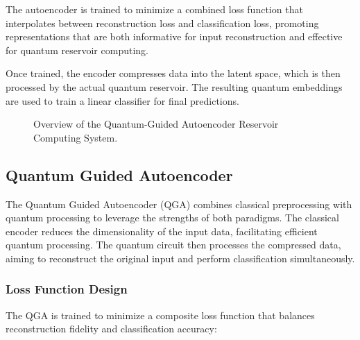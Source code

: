 \documentclass[conference]{IEEEtran}
\begin{document}
The autoencoder is trained to minimize a combined loss 
function that interpolates between reconstruction loss and 
classification loss, promoting representations that are both 
informative for input reconstruction and effective for quantum 
reservoir computing.

Once trained, the encoder compresses data into the latent 
space, which is then processed by the actual quantum reservoir. 
The resulting quantum embeddings are used to train a linear 
classifier for final predictions.


\begin{figure}[!h]
    \centering
    \label{fig:qgars_pipeline}
    \caption{Overview of the Quantum-Guided Autoencoder Reservoir Computing System.}
\end{figure}

\subsection{Quantum Guided Autoencoder}
The Quantum Guided Autoencoder (QGA) combines classical 
preprocessing with quantum processing to leverage 
the strengths of both paradigms. The classical encoder 
reduces the dimensionality of the input data, facilitating 
efficient quantum processing. The quantum circuit 
then processes the compressed data, aiming to reconstruct 
the original input and perform classification simultaneously.

\subsubsection{Loss Function Design}
The QGA is trained to minimize a composite loss 
function that balances reconstruction fidelity and 
classification accuracy:
\end{document}
